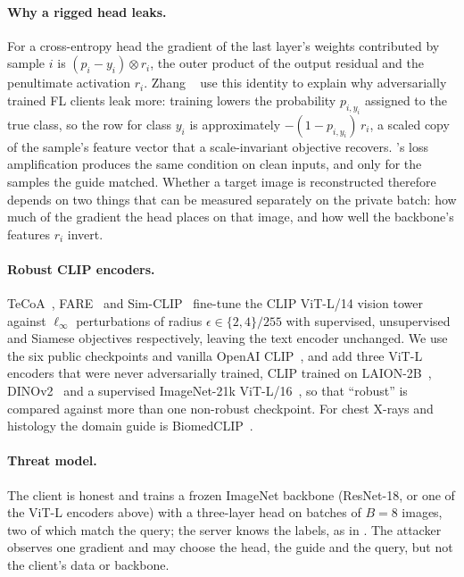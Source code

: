 \paragraph{Why a rigged head leaks.}
For a cross-entropy head the gradient of the last layer's weights contributed by sample $i$ is $(p_i-y_i)\otimes r_i$, the outer product of the output residual and the penultimate activation $r_i$.
Zhang \etal~\cite{zhang2022privacyat} use this identity to explain why adversarially trained FL clients leak more: training lowers the probability $p_{i,y_i}$ assigned to the true class, so the row for class $y_i$ is approximately $-(1-p_{i,y_i})\,r_i$, a scaled copy of the sample's feature vector that a scale-invariant objective recovers.
\geminio's loss amplification produces the same condition on clean inputs, and only for the samples the guide matched.
Whether a target image is reconstructed therefore depends on two things that can be measured separately on the private batch: how much of the gradient the head places on that image, and how well the backbone's features $r_i$ invert.

\paragraph{Robust CLIP encoders.}
TeCoA~\cite{tecoa2023}, FARE~\cite{fare2024} and Sim-CLIP~\cite{simclip2024} fine-tune the CLIP ViT-L/14 vision tower against $\ell_\infty$ perturbations of radius $\epsilon\in\{2,4\}/255$ with supervised, unsupervised and Siamese objectives respectively, leaving the text encoder unchanged.
We use the six public checkpoints and vanilla OpenAI CLIP~\cite{clip2021}, and add three ViT-L encoders that were never adversarially trained, CLIP trained on LAION-2B~\cite{openclip2023}, DINOv2~\cite{dinov2} and a supervised ImageNet-21k ViT-L/16~\cite{augreg2022}, so that ``robust'' is compared against more than one non-robust checkpoint.
For chest X-rays and histology the domain guide is BiomedCLIP~\cite{biomedclip2023}.

\paragraph{Threat model.}
The client is honest and trains a frozen ImageNet backbone (ResNet-18, or one of the ViT-L encoders above) with a three-layer head on batches of $B=8$ images, two of which match the query; the server knows the labels, as in \geminio.
The attacker observes one gradient and may choose the head, the guide and the query, but not the client's data or backbone.

